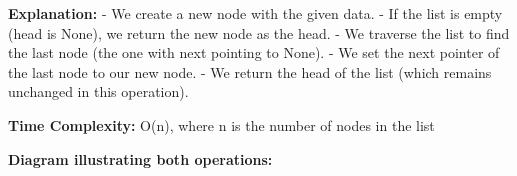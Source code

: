 \begin{Shaded}
\begin{Highlighting}[]
\OperatorTok{=}
    
     \NormalTok{:}
    
\OperatorTok{=}
    \NormalTok{:}
\OperatorTok{=}
    
 \OperatorTok{=}
    
\end{Highlighting}
\end{Shaded}

\textbf{Explanation:} - We create a new node with the given data. - If
the list is empty (head is None), we return the new node as the head. -
We traverse the list to find the last node (the one with next pointing
to None). - We set the next pointer of the last node to our new node. -
We return the head of the list (which remains unchanged in this
operation).

\textbf{Time Complexity:} O(n), where n is the number of nodes in the
list

\textbf{Diagram illustrating both operations:}

\begin{Shaded}
\begin{Highlighting}[]
\end{Highlighting}
\end{Shaded}

